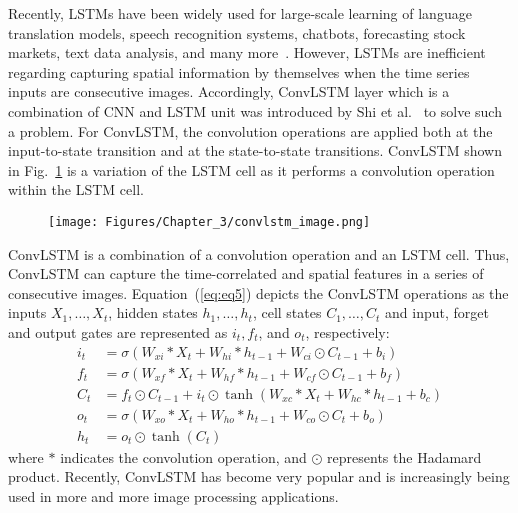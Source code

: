 Recently, LSTMs have been widely used for large-scale learning of language translation models, speech recognition systems, chatbots, forecasting stock markets, text data analysis, and many more~\cite{graves2014towards, cho2014properties}. 
However, LSTMs are inefficient regarding capturing spatial information by themselves when the time series inputs are consecutive images.
Accordingly, ConvLSTM layer which is a combination of CNN and LSTM unit was introduced by Shi et al.~\cite{xingjian2015convolutional} to solve such a problem.
For ConvLSTM, the convolution operations are applied both at the input-to-state transition and at the state-to-state transitions.  
ConvLSTM shown in Fig.~\ref{fig:ConvLSTM} is a variation of the LSTM cell as it performs a convolution operation within the LSTM cell.
\begin{figure}[h!]
	\begin{center}
		\texttt{[image: Figures/Chapter\_3/convlstm\_image.png]}
	\end{center}
	\label{fig:ConvLSTM}
\end{figure}
ConvLSTM is a combination of a convolution operation and an LSTM cell.
Thus, ConvLSTM can capture the time-correlated and spatial features in a series of consecutive images. 
Equation~(\ref{eq:eq5}) depicts the ConvLSTM operations as the inputs \(X_1, \dots, X_t\), hidden states \(h_1, \dots, h_t\), cell states \(C_1, \dots, C_t\) and input, forget and output gates are represented as \(i_t, f_t\), and \(o_t\), respectively:
\begin{equation}
	\begin{aligned}
		i_{t} &=\sigma\left(W_{x i} * X_{t}+W_{h i} * h_{t-1}+W_{c i} \odot C_{t-1}+b_{i}\right) 
		\\
		f_{t} &=\sigma\left(W_{x f} * X_{t}+W_{h f} * h_{t-1}+W_{c f} \odot C_{t-1}+b_{f}\right) \\
		C_{t} &=f_{t} \odot C_{t-1}+i_{t} \odot \tanh \left(W_{x c} * X_{t}+W_{h c} * h_{t-1}+b_{c}\right) 
		\\
		o_{t} &=\sigma\left(W_{x o} * X_{t}+W_{h o} * h_{t-1}+W_{c o} \odot C_{t}+b_{o}\right) \\
		h_{t} &=o_{t} \odot \tanh \left(C_{t}\right)
	\end{aligned}
	\label{eq:eq5}
\end{equation}
where \(*\) indicates the convolution operation, and \(\odot\) represents the 
Hadamard product. 
Recently, ConvLSTM has become very popular and is increasingly being used in 
more and more image processing applications.